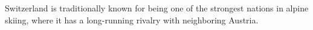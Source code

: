 Switzerland is traditionally known for being one of the strongest nations in alpine skiing, where it has a long-running rivalry with neighboring Austria.